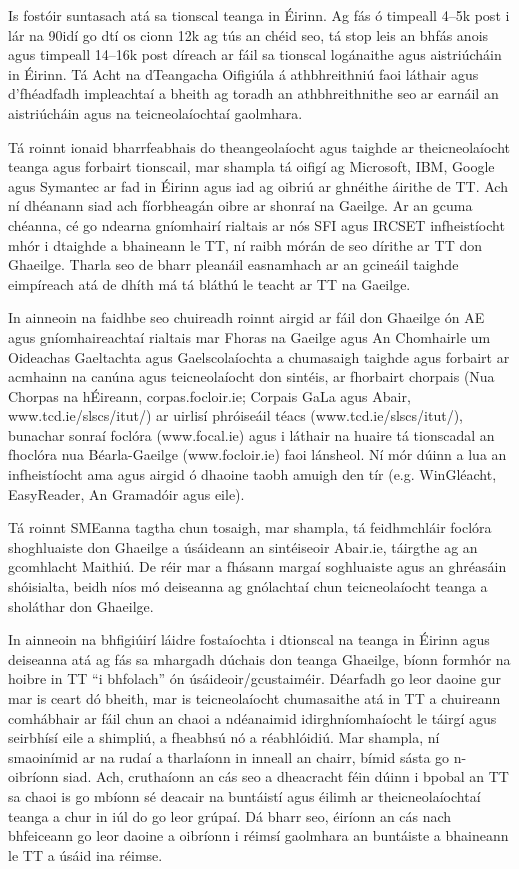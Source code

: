 \begin{multicols}{2}
Is fostóir suntasach atá sa tionscal teanga in Éirinn. Ag fás ó timpeall 4--5k post i lár na 90idí go dtí os cionn 12k ag tús an chéid seo, tá stop leis an bhfás anois agus timpeall 14--16k post díreach ar fáil sa tionscal logánaithe agus aistriúcháin in Éirinn. Tá Acht na dTeangacha Oifigiúla á athbhreithniú faoi láthair agus d'fhéadfadh impleachtaí a bheith ag toradh an athbhreithnithe seo ar earnáil an aistriúcháin agus na teicneolaíochtaí gaolmhara.

Tá roinnt ionaid bharrfeabhais do theangeolaíocht agus taighde ar theicneolaíocht teanga agus forbairt tionscail, mar shampla tá oifigí ag Microsoft, IBM, Google agus Symantec ar fad in Éirinn agus iad ag oibriú ar ghnéithe áirithe de TT. Ach ní dhéanann siad ach fíorbheagán oibre ar shonraí na Gaeilge. Ar an gcuma chéanna, cé go ndearna gníomhairí rialtais ar nós SFI agus IRCSET infheistíocht mhór i dtaighde a bhaineann le TT, ní raibh mórán de seo dírithe ar TT don Ghaeilge. Tharla seo de bharr pleanáil easnamhach ar an gcineáil taighde eimpíreach atá de dhíth má tá bláthú le teacht ar TT na Gaeilge.

In ainneoin na faidhbe seo chuireadh roinnt airgid ar fáil don Ghaeilge ón AE agus gníomhaireachtaí rialtais mar Fhoras na Gaeilge agus An Chomhairle um Oideachas Gaeltachta agus Gaelscolaíochta a chumasaigh taighde agus forbairt ar acmhainn na canúna agus teicneolaíocht don sintéis,  ar fhorbairt chorpais (Nua Chorpas na hÉireann, corpas.focloir.ie; Corpais GaLa agus Abair, www.tcd.ie/slscs/itut/) ar uirlisí phróiseáil téacs (www.tcd.ie/slscs/itut/), bunachar sonraí foclóra (www.focal.ie) agus i láthair na huaire tá tionscadal an fhoclóra nua Béarla-Gaeilge (www.focloir.ie)  faoi lánsheol. Ní mór dúinn a lua an infheistíocht ama agus airgid ó dhaoine  taobh amuigh den tír (e.g. WinGléacht, EasyReader, An Gramadóir agus eile).

Tá roinnt SMEanna tagtha chun tosaigh, mar shampla, tá feidhmchláir foclóra shoghluaiste don Ghaeilge a úsáideann an sintéiseoir Abair.ie, táirgthe ag an gcomhlacht Maithiú. De réir mar a fhásann margaí soghluaiste agus an ghréasáin shóisialta, beidh níos mó deiseanna ag gnólachtaí chun teicneolaíocht teanga a sholáthar don Ghaeilge.

In ainneoin na bhfigiúirí láidre fostaíochta i dtionscal na teanga in Éirinn agus deiseanna atá ag fás sa mhargadh dúchais don teanga Ghaeilge, bíonn formhór na hoibre in TT ``i bhfolach'' ón úsáideoir/gcustaiméir. Déarfadh go leor daoine gur mar is ceart dó bheith, mar is teicneolaíocht chumasaithe atá in TT a chuireann comhábhair ar fáil chun an chaoi a ndéanaimid idirghníomhaíocht le táirgí agus seirbhísí eile a shimpliú, a fheabhsú nó a réabhlóidiú. Mar shampla, ní smaoinímid ar na rudaí a tharlaíonn in inneall an chairr, bímid sásta go n-oibríonn siad. Ach, cruthaíonn an cás seo a dheacracht féin dúinn i bpobal an TT sa chaoi is go mbíonn sé deacair na buntáistí agus éilimh ar theicneolaíochtaí teanga a chur in iúl do go leor grúpaí. Dá bharr seo, éiríonn an cás nach bhfeiceann go leor daoine a oibríonn i réimsí gaolmhara an buntáiste a bhaineann le TT a úsáid ina réimse. 


\end{multicols}
